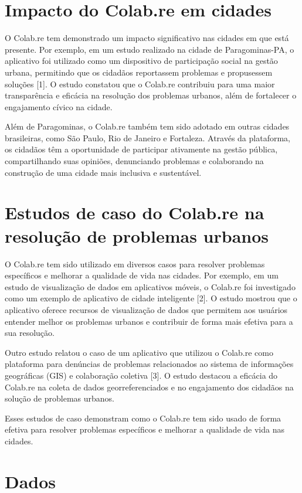 \section{Impacto do Colab.re em cidades}
O Colab.re tem demonstrado um impacto significativo nas cidades em que está presente. Por exemplo, em um estudo realizado na cidade de Paragominas-PA, o aplicativo foi utilizado como um dispositivo de participação social na gestão urbana, permitindo que os cidadãos reportassem problemas e propusessem soluções [1]. O estudo constatou que o Colab.re contribuiu para uma maior transparência e eficácia na resolução dos problemas urbanos, além de fortalecer o engajamento cívico na cidade.

Além de Paragominas, o Colab.re também tem sido adotado em outras cidades brasileiras, como São Paulo, Rio de Janeiro e Fortaleza. Através da plataforma, os cidadãos têm a oportunidade de participar ativamente na gestão pública, compartilhando suas opiniões, denunciando problemas e colaborando na construção de uma cidade mais inclusiva e sustentável.

\section{Estudos de caso do Colab.re na resolução de problemas urbanos}
O Colab.re tem sido utilizado em diversos casos para resolver problemas específicos e melhorar a qualidade de vida nas cidades. Por exemplo, em um estudo de visualização de dados em aplicativos móveis, o Colab.re foi investigado como um exemplo de aplicativo de cidade inteligente [2]. O estudo mostrou que o aplicativo oferece recursos de visualização de dados que permitem aos usuários entender melhor os problemas urbanos e contribuir de forma mais efetiva para a sua resolução.

Outro estudo relatou o caso de um aplicativo que utilizou o Colab.re como plataforma para denúncias de problemas relacionados ao sistema de informações geográficas (GIS) e colaboração coletiva [3]. O estudo destacou a eficácia do Colab.re na coleta de dados georreferenciados e no engajamento dos cidadãos na solução de problemas urbanos.

Esses estudos de caso demonstram como o Colab.re tem sido usado de forma efetiva para resolver problemas específicos e melhorar a qualidade de vida nas cidades.

\section{Dados}

